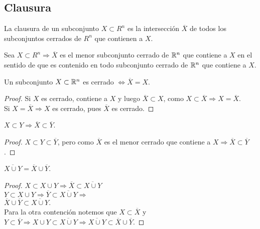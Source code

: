 \subsection{Clausura}

\begin{definition}[Clausura]
  La clausura de un subconjunto $X \subset R^n$ es la intersección $\overline{X}$ de todos los subconjuntos cerrados de $R^n$ que contienen a $X$.
\end{definition}

\begin{prop}
  Sea $X \subset R^n \Rightarrow \overline{X}$ es el menor subconjunto cerrado de $\mathbb{R}^n$ que contiene a $X$ en el sentido de que es contenido en todo subconjunto cerrado de $\mathbb{R}^n$ que contiene a $X$.
\end{prop}

\begin{corollary}
  Un subconjunto $X \subset \mathbb{R}^n$ es cerrado $\iff \overline{X} = X$.
  \begin{proof}
    Si $X$ es cerrado, contiene a $X$ y luego $\overline{X} \subset X$, como $X \subset \overline{X} \Rightarrow X = \overline{X}$. \\
    Si $X = \overline{X} \Rightarrow X$ es cerrado, pues $\overline{X}$ es cerrado.
  \end{proof}
\end{corollary}

\begin{prop}
  $X \subset Y \Rightarrow \overline{X} \subset \overline{Y}$.
  \begin{proof}
    $X \subset Y \subset \overline{Y}$, pero como $\overline{X}$ es el menor cerrado que contiene a $X \Rightarrow \overline{X} \subset \overline{Y}$.
  \end{proof}
\end{prop}

\begin{prop}
  $\overline{X \cup Y} = \overline{X} \cup \overline{Y}$.
  \begin{proof}
    $X \subset X \cup Y \Rightarrow \overline{X} \subset \overline{X \cup Y}$ \\
    $Y \subset X \cup Y \Rightarrow \overline{Y} \subset \overline{X \cup Y} \Rightarrow$ \\
    $\overline{X} \cup \overline{Y} \subset \overline{X \cup Y}$. \\
    Para la otra contención notemos que $X \subset \overline{X}$ y $Y \subset \overline{Y} \Rightarrow X \cup Y \subset \overline{X \cup Y} \Rightarrow \overline{X \cup Y} \subset \overline{X} \cup \overline{Y}$.
  \end{proof}
\end{prop}

